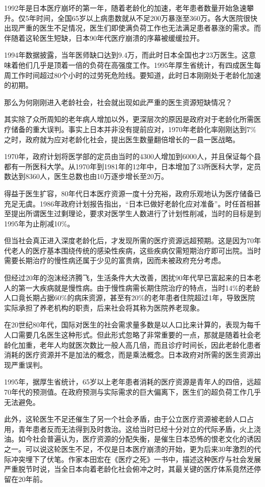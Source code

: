1992年是日本医疗崩坏的第一年，随着老龄化的加速，老年患者数量开始急速攀升。仅5年时间，全国65岁以上病患数就从不足200万暴涨至360万。各大医院很快出现严重的医生不足情况，医生们即使满负荷工作也无法满足患者暴涨的需求。而伴随着这轮医生短缺，日本90年代医疗崩溃的序幕被缓缓拉开。

1994年数据披露，当年医师缺口达到9.4万，而此时日本全国也才23万医生。这意味着他们几乎是顶着一倍的负荷在高强度工作。1995年厚生省统计，有四成医生每周工作时间超过80个小时的过劳死危险线。要知道，此时日本刚刚处于老龄化加速的初期。

那么为何刚刚进入老龄社会，社会就出现如此严重的医生资源短缺情况？

其实除了众所周知的老年病人增加以外，更深层次的原因是政府对于老龄化所需医疗储备的重大误判。事实上日本并非没有提前应对，1970年老龄化率刚刚达到7\%之时，政府就为应对老龄化社会，提出医生数量翻倍增长的一县一医战略。

1970年，政府计划将医学部的定员由当时的4300人增加到6000人，并且保证每个县都有一所医科大学。从1970年到1981年的12年中，日本增加了33所医科大学，定员数达到8360人，医生总数也由10万逐步增长至20万。

得益于医生扩容，80年代日本医疗资源一度十分充裕，政府乐观地认为医疗储备已充足无虞。1986年政府计划报告指出，“日本已做好老龄化应对准备”。时任首相甚至提出所谓医生过剩理论，要求对医学生人数进行了计划性削减，当时的目标是到1995年为止削减10\%。

但当社会真正进入深度老龄化后，才发现所需的医疗资源远超预期。这是因为70年代老人的医疗基本围绕传统的感染性疾病，这些疾病仅需短期治疗即可出院。当时需要长期治疗的慢性病还属于少见的富贵病，因而未被政府充分考虑。

但经过20年的泡沫经济腾飞，生活条件大大改善，困扰90年代早已富起来的日本老人的第一大疾病就是慢性病。由于慢性病需长期住院治疗的特点，当时14\%的老龄人口竟长期占据60\%的病床资源，甚至有20\%的老年患者住院超过1年，导致医院实际承担了养老机构的职责，后来社会将其称为医院养老现象。

在20世纪80年代，国际对医生的社会需求量多数是以人口比来计算的，表现为每千人口需要几名医生这种形式。但此形式忽略了非常重要的一点，那就是随着社会老龄化加重，老年人均就医次数比一般人高几倍，而且诊疗时间长，因此老龄化患者消耗的医疗资源并不是加法的概念，而是乘法概念。日本政府对所需的医生资源出现严重误判。

1995年，据厚生省统计，65岁以上老年患者消耗的医疗资源是青年人的四倍，远超70年代的预测值。在政府预测与实际需求的巨大偏离下，医生们的超负荷工作几乎无法避免。

此外，这轮医生不足还催生了另一个社会矛盾，由于公立医疗资源被老龄人口占用，青年患者反而无法得到及时救治。这给当时已经十分对立的代际矛盾，火上浇油。如今社会普遍认为，医疗资源的分配失衡，是催生日本恐怖的恨老文化的诱因之一。可以说这轮医生不足，不仅是日本医疗崩溃的开始，更为后来30年激烈的代际冲突埋下了伏笔。作家本田宏在《医疗之死》一书中，描述这种医疗与社会发展严重脱节时说，当全日本向着老龄化社会俯冲之时，其最关键的医疗体系竟然还停留在20年前。

